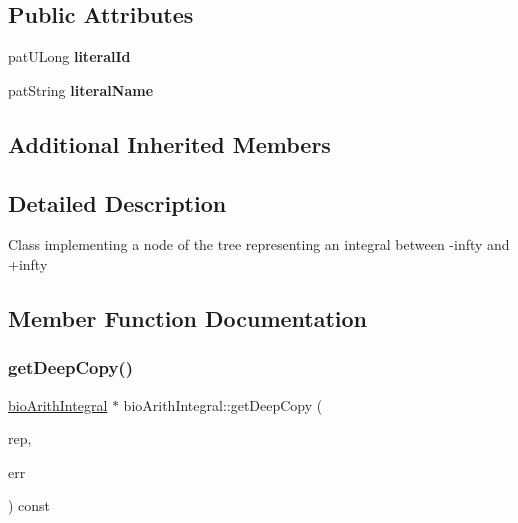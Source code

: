 \subsection*{Public Attributes}
\begin{DoxyCompactItemize}
\item 
\mbox{\label{classbio_arith_integral_adef079988a2f026769bdf7103a40a3d1}} 
pat\+U\+Long {\bfseries literal\+Id}
\item 
\mbox{\label{classbio_arith_integral_ac1fe8365a90bbc1a5dea95236f6712aa}} 
pat\+String {\bfseries literal\+Name}
\end{DoxyCompactItemize}
\subsection*{Additional Inherited Members}


\subsection{Detailed Description}
Class implementing a node of the tree representing an integral between -\/infty and +infty 

\subsection{Member Function Documentation}
\mbox{\label{classbio_arith_integral_a49fa38b94818140c143ecb6cb3d7ceed}} 
\subsubsection{\texorpdfstring{get\+Deep\+Copy()}{getDeepCopy()}}
{\footnotesize\ttfamily \hyperlink{classbio_arith_integral}{bio\+Arith\+Integral} $\ast$ bio\+Arith\+Integral\+::get\+Deep\+Copy (\begin{DoxyParamCaption}\item[{\hyperlink{classbio_expression_repository}{bio\+Expression\+Repository} $\ast$}]{rep,  }\item[{pat\+Error $\ast$\&}]{err }\end{DoxyParamCaption}) const\hspace{0.3cm}{\ttfamily [virtual]}}

